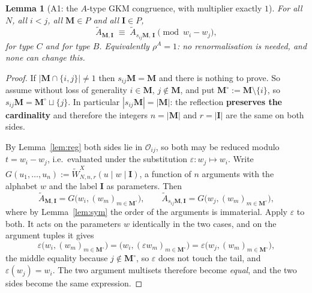 \documentclass[11pt]{article}
\theoremstyle{plain}
\newtheorem{lem}[thm]{Lemma}
\theoremstyle{definition}
\theoremstyle{remark}
\theoremstyle{plain}
\newcommand{\bI}{\mathbf{I}}
\newcommand{\bM}{\mathbf{M}}
\newcommand{\At}{\widetilde{A}}
\newcommand{\sm}{\setminus}
\begin{document}
\begin{lem}[A1: the $A$-type GKM congruence, with multiplier exactly $1$]\label{lem:A1}
For all $N$, all $i<j$, all $\bM\in P$ and all $\bI\in P$,
\[
   \At_{\bM,\bI}\;\equiv\;\At_{s_{ij}\bM,\,\bI}\pmod{w_i-w_j},
\]
for type $C$ and for type $B$.  Equivalently $\rho^A=1$: no renormalisation is
needed, and none can change this.
\end{lem}

\begin{proof}
If $|\bM\cap\{i,j\}|\neq1$ then $s_{ij}\bM=\bM$ and there is nothing to prove.
So assume without loss of generality $i\in\bM$, $j\notin\bM$, and put
$\bM^{\circ}:=\bM\sm\{i\}$, so $s_{ij}\bM=\bM^{\circ}\sqcup\{j\}$.  In
particular $|s_{ij}\bM|=|\bM|$: the reflection \textbf{preserves the cardinality}
and therefore the integers $n=|\bM|$ and $r=|\bI|$ are the same on both sides.

By Lemma~\ref{lem:reg} both sides lie in $\mathcal{O}_{ij}$, so both may be
reduced modulo $t=w_i-w_j$, i.e.\ evaluated under the substitution
$\varepsilon:w_j\mapsto w_i$.  Write
$G(u_1,\dots,u_n):=\widetilde{W}^X_{N,n,r}(u\mid w\mid\bI)$, a function of $n$
arguments with the alphabet $w$ and the label $\bI$ as parameters.  Then
\[
   \At_{\bM,\bI}=G\bigl(w_i,(w_m)_{m\in\bM^{\circ}}\bigr),
   \qquad
   \At_{s_{ij}\bM,\bI}=G\bigl(w_j,(w_m)_{m\in\bM^{\circ}}\bigr),
\]
where by Lemma~\ref{lem:sym} the order of the arguments is immaterial.  Apply
$\varepsilon$ to both.  It acts on the parameters $w$ identically in the two
cases, and on the argument tuples it gives
\[
   \varepsilon\bigl(w_i,(w_m)_{m\in\bM^{\circ}}\bigr)
   =\bigl(w_i,(\varepsilon w_m)_{m\in\bM^{\circ}}\bigr)
   =\varepsilon\bigl(w_j,(w_m)_{m\in\bM^{\circ}}\bigr),
\]
the middle equality because $j\notin\bM^{\circ}$, so $\varepsilon$ does not touch
the tail, and $\varepsilon(w_j)=w_i$.  The two argument multisets therefore
become \emph{equal}, and the two sides become the same expression.
\end{proof}
\end{document}
